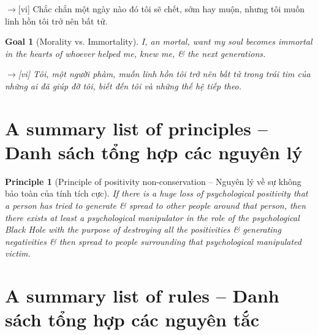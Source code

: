 \documentclass[12pt,oneside]{book}
\newtheorem{goal}{Goal}
\newtheorem{principle}{Principle}
\begin{document}
{\sf[en]$\to$[vi]} Chắc chắn một ngày nào đó tôi sẽ chết, sớm hay muộn, nhưng tôi muốn linh hồn tôi trở nên bất tử.

\begin{goal}[Morality vs. Immortality]
	I, an mortal, want my soul becomes immortal in the hearts of whoever helped me, knew me, \& the next generations.
	
	{\sf[en]$\to$[vi]} Tôi, một người phàm, muốn linh hồn tôi trở nên bất tử trong trái tim của những ai đã giúp đỡ tôi, biết đến tôi và những thế hệ tiếp theo.
\end{goal}

\section{A summary list of principles -- Danh sách tổng hợp các nguyên lý}

\begin{principle}[Principle of positivity non-conservation -- Nguyên lý về sự không bảo toàn của tính tích cực]
	If there is a huge loss of psychological positivity that a person has tried to generate \& spread to other people around that person, then there exists at least a psychological manipulator in the role of the psychological Black Hole with the purpose of destroying all the positivities \& generating negativities \& then spread to people surrounding that psychological manipulated victim.
\end{principle}

\section{A summary list of rules -- Danh sách tổng hợp các nguyên tắc}
\end{document}
